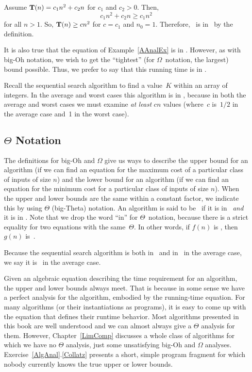 \begin{example}
\label{AAnalEx}
Assume \(\mbox{$\textbf{T}(n)$} = c_1 n^2 + c_2 n\) for \(c_1\) and \(c_2 > 0\).
Then,
\[c_1 n^2 + c_2 n \geq c_1 n^2\]
for all \(n > 1\).
So, \(\mbox{$\textbf{T}(n)$} \geq c n^2\) for \(c = c_1\) and \(n_0 = 1\).
Therefore, \Tn\ is in \Omegantwo\ by the definition.
\end{example}

It is also true that the equation of Example~\ref{AAnalEx} is in
\Omegan.
However, as with big-Oh notation, we wish to get the ``tightest''
(for \(\Omega\)~notation, the largest) bound possible.
Thus, we prefer to say that this running time is in \Omegantwo.

Recall the sequential search algorithm to find a value~\(K\)
within an array of integers.
In the average and worst cases this algorithm is in \Omegan,
because in both the average and worst cases we must examine
\emph{at least} \(cn\) values (where~\(c\) is~\(1/2\) in the average
case and~1 in the worst case).

\subsection{$\Theta$ Notation}

The definitions for big-Oh and
\(\Omega\) give us ways to
describe the upper bound for an algorithm (if we can find an equation
for the maximum cost of a particular class of inputs of size \(n\))
and the lower bound for an algorithm
(if we can find an equation for the minimum cost for
a particular class of inputs of size \(n\)).
When the upper and lower bounds are the same within a constant factor,
we indicate this by using \(\Theta\) (big-Theta) notation.
An algorithm is said to be \Thetahn\ if it is in \Ohn\ \emph{and} it
is in \Omegahn.
Note that we drop the word ``in'' for \(\Theta\)~notation,
because there is a strict equality for two equations with the
same~\(\Theta\).
In other words, if \(f(n)\) is \Thetagn, then \(g(n)\) is~\Thetafn.

Because the sequential search algorithm is both in \On\ and in
\Omegan\ in the average case, we say it is \Thetan\ in the average
case.

Given an algebraic equation describing the time requirement for
an algorithm, the upper and lower bounds always meet.
That is because in some sense we have a perfect analysis for the
algorithm, embodied by the running-time equation.
For many algorithms (or their instantiations as programs), it is easy
to come up with the equation that defines their runtime behavior.
Most algorithms presented in this book are well understood and we can
almost always give a \(\Theta\) analysis for them.
However, Chapter~\ref{LimComp} discusses a whole class of
algorithms for which we have no \(\Theta\) analysis, just some
unsatisfying big-Oh and \(\Omega\) analyses.
Exercise~\ref{AlgAnal}.\ref{Collatz}
presents a short,
simple program fragment
for which nobody currently knows the true upper or lower bounds.

